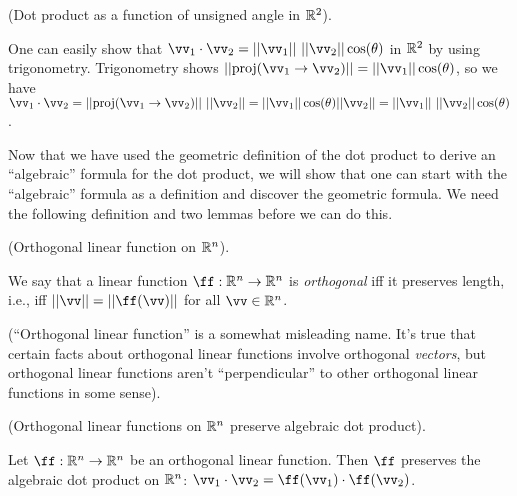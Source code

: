 \begin{remark}
    (Dot product as a function of unsigned angle in $\mathbb{R}^2$).
    
    One can easily show that $\vv_1 \cdot \vv_2 = ||\vv_1|| \spc ||\vv_2|| \cos(\theta)$ in $\mathbb{R}^2$ by using trigonometry. Trigonometry shows $||\proj(\vv_1 \rightarrow \vv_2)|| = ||\vv_1|| \cos(\theta)$, so we have $\vv_1 \cdot \vv_2 = ||\proj(\vv_1 \rightarrow \vv_2)|| \spc ||\vv_2|| = ||\vv_1|| \cos(\theta) ||\vv_2|| = ||\vv_1|| \spc ||\vv_2|| \cos(\theta)$.
\end{remark}

Now that we have used the geometric definition of the dot product to derive an ``algebraic'' formula for the dot product, we will show that one can start with the ``algebraic'' formula as a definition and discover the geometric formula. We need the following definition and two lemmas before we can do this.

\begin{defn}
\label{ch::lin_alg::defn::orthogonal_linear_fn_Rn}
    (Orthogonal linear function on $\mathbb{R}^n$).
    
    We say that a linear function $\ff:\R^n \rightarrow \R^n$ is \textit{orthogonal} iff it preserves length, i.e., iff $||\vv|| = ||\ff(\vv)||$ for all $\vv \in \R^n$.
    
    (``Orthogonal linear function'' is a somewhat misleading name. It's true that certain facts about orthogonal linear functions involve orthogonal \textit{vectors}, but orthogonal linear functions aren't ``perpendicular'' to other orthogonal linear functions in some sense).
\end{defn}

\begin{lemma}
\label{ch::lin_alg::lemma::orthogonal_linear_fns_preserve_alg_dot_product}
    (Orthogonal linear functions on $\mathbb{R}^n$ preserve algebraic dot product).
    
    Let $\ff:\R^n \rightarrow \R^n$ be an orthogonal linear function. Then $\ff$ preserves the algebraic dot product on $\mathbb{R}^n$: $\vv_1 \cdot \vv_2 = \ff(\vv_1) \cdot \ff(\vv_2)$.
\end{lemma}

